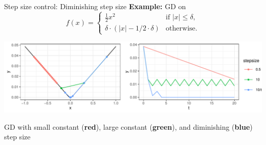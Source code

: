 \documentclass[11pt,compress,t,notes=noshow, xcolor=table]{beamer}
\begin{document}
\begin{vbframe}{Step size control: Diminishing step size}
        \textbf{Example:} GD on
        \begin{equation*}
            f(x) = 
            \begin{cases}
                \frac{1}{2} x^2 & \text{if $|x| \le \delta$}, \\
                \delta \cdot (|x|- 1 / 2 \cdot \delta) & \text{otherwise}.
            \end{cases}
        \end{equation*}
        \begin{center}
            \includegraphics[width=\textwidth]{figure_man/fixed_vs_adaptive.pdf} \\
            \begin{footnotesize}
                GD with small constant (\textbf{red}), large constant (\textbf{green}), and diminishing (\textbf{blue}) step size
            \end{footnotesize}
        \end{center}
		
	\end{vbframe}	
	
\end{document}
